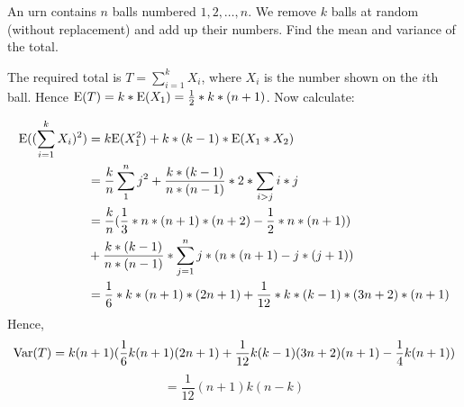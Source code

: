 \question An urn contains $n$ balls numbered $1, 2, \dotsc , n$. We 
remove $k$ balls at random (without replacement) and add up their 
numbers. Find the mean and variance of the total. 
\begin{solution}[7cm]
The required total is $T=\sum_{i = 1}^{k} X_i$, where $X_i$ is the 
number shown on the $i$th ball. Hence $\text{E}(T) = k * \text{E}(X_1) = 
\frac{1}{2} * k * (n + 1)$. Now calculate:

\begin{equation}
\begin{split}
\text{E}((\sum_{i = 1}^{k} X_i)^2) &= k \text{E}(X_1^2) + k*(k - 1)*\text{E}(X_1*X_2) \\ \nonumber
&= \frac{k}{n} \sum_{1}^{n} j^2 + \frac{k * (k - 1)}{n * (n - 1)} * 
2 * \sum_{i>j} i * j \\
&= \frac{k}{n} (\frac{1}{3} * n * (n + 1) * (n + 2) - \frac{1}{2} * 
n * (n + 1)) \\
&+ \frac{k * (k - 1)}{n * (n - 1)} * \sum_{j = 1}^{n} j * (n * (n + 1) 
- j * (j + 1)) \\
&= \frac{1}{6} * k * (n + 1) * (2n + 1) + \frac{1}{12} * k * (k - 1) * 
(3n + 2) * (n + 1)
\end{split}
\end{equation}
Hence,
\[\text{Var}(T) = k (n + 1)  (\frac{1}{6}  k  (n + 1) (2n + 1) + \frac{1}{12} 
 k  (k - 1)  (3n + 2)  (n + 1) - \frac{1}{4}  k  (n + 1)) \]
\[= \frac{1}{12}  (n + 1)  k  (n - k)\]

\end{solution}